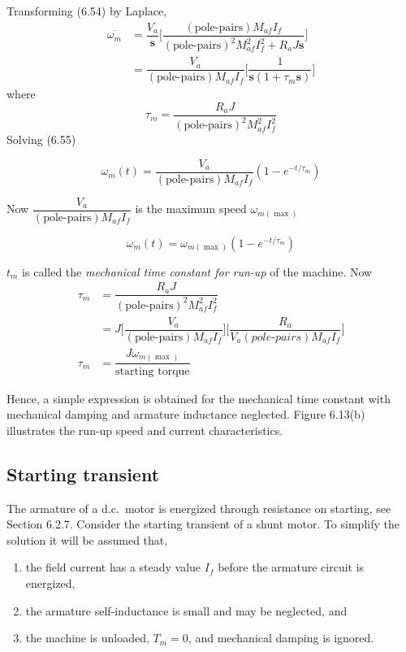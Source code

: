 \documentclass[a4paper,numbers=noenddot,12pt]{scrbook}
\begin{document}
Transforming (6.54) by Laplace,
\begin{align}
    \overline{\omega_m} & = \dfrac{V_a}{\mathbf{s}} \bigg[ \dfrac{(\text{pole-pairs}) M_{af} I_f}{{(\text{pole-pairs})}^2 M_{af}^2 I_f^2 + R_a J \mathbf{s}} \bigg] \nonumber \\
    & = \dfrac{V_a}{(\text{pole-pairs}) M_{af} I_f} \bigg[ \dfrac{1}{\mathbf{s}(1 + \tau_m \mathbf{s})}\bigg]
    \label{}
\end{align}
where
\begin{equation}
    \tau_m = \dfrac{R_a J}{{(\text{pole-pairs})}^2 M_{af}^2 I_f^2}
    \label{}
\end{equation}
Solving (6.55)

\begin{equation}
    \omega_m (t) = \dfrac{V_a}{(\text{pole-pairs}) M_{af} I_f} (1-e^{-t / \tau_m})
    \label{}
\end{equation}

Now $\dfrac{V_a}{(\text{pole-pairs}) M_{af} I_f}$ is the maximum speed $\omega_{m(\max)}$

\begin{equation}
    \omega_m(t) = \omega_{m(\max)} (1 - e^{-t / \tau_m})
    \label{}
\end{equation}

$t_m$ is called the \textit{mechanical time constant for run-up} of the machine.
Now
\begin{align}
    \tau_m & = \dfrac{R_a J}{{(\text{pole-pairs})}^2 M_{af}^2 I_f^2} \nonumber \\
    & = J \bigg[ \dfrac{V_a}{(\text{pole-pairs}) M_{af} I_f}\bigg] \bigg[\dfrac{R_a}{V_a (\textit{pole-pairs}) M_{af} I_f}\bigg] \nonumber \\
    \tau_m & = \dfrac{J \omega_{m(\max)}}{\text{starting torque}}
    \label{}
\end{align}

Hence, a simple expression is obtained for the mechanical time constant with mechanical damping and armature inductance neglected. Figure 6.13(b) illustrates the run-up speed and current characteristics.

\subsection{Starting transient} The armature of a d.c.\ motor is energized through resistance on starting, see Section 6.2.7. Consider the starting transient of a shunt motor. To simplify the solution it will be assumed that,
\begin{enumerate}[label={(\alph*)}]
    \item the field current has a steady value $I_f$ before the armature circuit is energized,
    \item the armature self-inductance is small and may be neglected, and
    \item the machine is unloaded, $T_m = 0$, and mechanical damping is ignored.
\end{enumerate}
\end{document}
